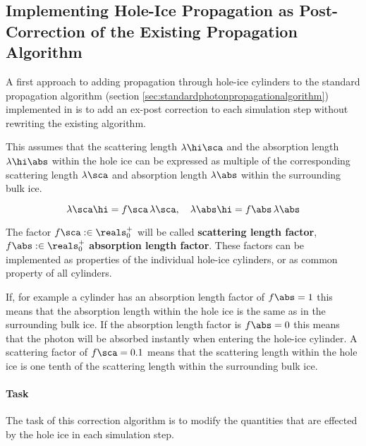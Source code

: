 
\subsection{Implementing Hole-Ice Propagation as Post-Correction of the Existing Propagation Algorithm}
\label{sec:algorithm_a}


A first approach to adding propagation through hole-ice cylinders to the standard propagation algorithm (section \ref{sec:standardphotonpropagationalgorithm}) implemented in  is to add an ex-post correction to each simulation step without rewriting the existing algorithm.


This assumes that the scattering length $\lambda\hi\sca$ and the absorption length $\lambda\hi\abs$ within the hole ice can be expressed as multiple of the corresponding scattering length $\lambda\sca$ and absorption length $\lambda\abs$ within the surrounding bulk ice.

$$
  \lambda\sca\hi = f\sca \, \lambda\sca, \ \ \ \lambda\abs\hi = f\abs \, \lambda\abs
$$

The factor $f\sca :\in \reals^+_0$ will be called \textbf{scattering length factor}, $f\abs :\in \reals^+_0$ \textbf{absorption length factor}. These factors can be implemented as properties of the individual hole-ice cylinders, or as common property of all cylinders.

If, for example a cylinder has an absorption length factor of $f\abs = 1$ this means that the absorption length within the hole ice is the same as in the surrounding bulk ice. If the absorption length factor is $f\abs = 0$ this means that the photon will be absorbed instantly when entering the hole-ice cylinder. A scattering factor of $f\sca=0.1$ means that the scattering length within the hole ice is one tenth of the scattering length within the surrounding bulk ice.

\paragraph{Task} The task of this correction algorithm is to modify the quantities that are effected by the hole ice in each simulation step.


